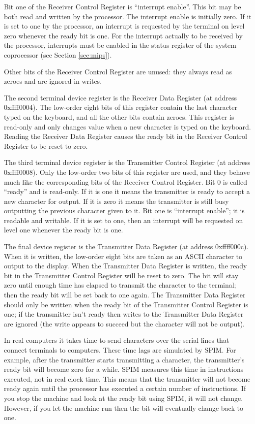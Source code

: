 Bit one of the Receiver Control Register is ``interrupt enable''.
This bit may be both read and written by the processor.  The interrupt
enable is initially zero.  If it is set to one by the processor, an
interrupt is requested by the terminal on level zero whenever the
ready bit is one.  For the interrupt actually to be received by the
processor, interrupts must be enabled in the status register of the
system coprocessor (see Section \ref{sec:mips}).

Other bits of the Receiver Control Register are unused: they always
read as zeroes and are ignored in writes.

The second terminal device register is the Receiver Data Register (at
address 0xffff0004).  The low-order eight bits of this register
contain the last character typed on the keyboard, and all the other
bits contain zeroes.  This register is read-only and only changes
value when a new character is typed on the keyboard.  Reading the
Receiver Data Register causes the ready bit in the Receiver Control
Register to be reset to zero.

The third terminal device register is the Transmitter Control Register
(at address 0xffff0008).  Only the low-order two bits of this register
are used, and they behave much like the corresponding bits of the
Receiver Control Register.  Bit 0 is called ``ready'' and is
read-only.  If it is one it means the transmitter is ready to accept a
new character for output.  If it is zero it means the transmitter is
still busy outputting the previous character given to it.  Bit one is
``interrupt enable''; it is readable and writable.  If it is set to
one, then an interrupt will be requested on level one whenever the
ready bit is one.

The final device register is the Transmitter Data Register (at address
0xffff000c).  When it is written, the low-order eight bits are taken
as an ASCII character to output to the display.  When the Transmitter
Data Register is written, the ready bit in the Transmitter Control
Register will be reset to zero.  The bit will stay zero until enough
time has elapsed to transmit the character to the terminal; then the
ready bit will be set back to one again.  The Transmitter Data
Register should only be written when the ready bit of the Transmitter
Control Register is one; if the transmitter isn't ready then writes to
the Transmitter Data Register are ignored (the write appears to
succeed but the character will not be output).

In real computers it takes time to send characters over the serial
lines that connect terminals to computers.  These time lags are
simulated by SPIM.  For example, after the transmitter starts
transmitting a character, the transmitter's ready bit will become zero
for a while.  SPIM measures this time in instructions executed, not in
real clock time.  This means that the transmitter will not become
ready again until the processor has executed a certain number of
instructions.  If you stop the machine and look at the ready bit using
SPIM, it will not change.  However, if you let the machine run then
the bit will eventually change back to one.


